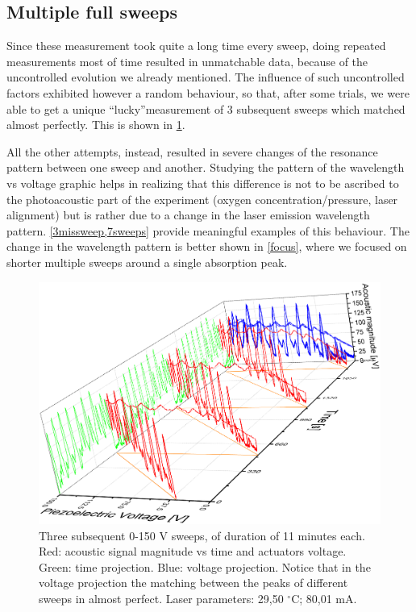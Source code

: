 	\subsection{Multiple full sweeps}
Since these measurement took quite a long time every sweep, doing repeated measurements most of time resulted in unmatchable data, because of the uncontrolled evolution we already mentioned. The influence of such uncontrolled factors exhibited however a random behaviour, so that, after some trials, we were able to get a unique \textquotedblleft lucky\textquotedblright measurement of 3 subsequent sweeps which matched almost perfectly. This is shown in \cref{3sweep}.

All the other attempts, instead, resulted in severe changes of the resonance pattern between one sweep and another. Studying the pattern of the wavelength vs voltage graphic helps in realizing that this difference is not to be ascribed to the photoacoustic part of the experiment (oxygen concentration/pressure, laser alignment) but is rather due to a change in the laser emission wavelength pattern. \cref{3missweep,7sweeps} provide meaningful examples of this behaviour.
The change in the wavelength pattern is better shown in \cref{focus}, where we focused
on shorter multiple sweeps around a single absorption peak.
\begin{landscape}
\begin{figure}[!bhtp]\centering
\includegraphics[height=\textheight, draft=\foto]{eps/3sweepsmatching.eps}
\caption{Three subsequent 0-150 V sweeps, of duration of 11 minutes each. Red: acoustic signal magnitude vs time and actuators voltage. Green: time projection. Blue: voltage projection. Notice that in the voltage projection the matching between the peaks of different sweeps in almost perfect. Laser parameters: 29,50 $^\circ$C; 80,01 mA.}
\label{3sweep}
\end{figure}\vfill
\end{landscape}

